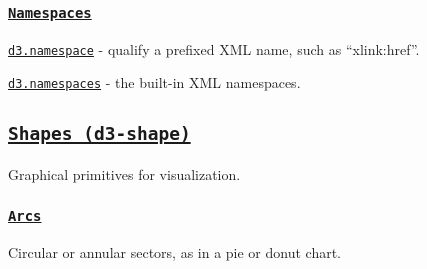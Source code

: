 \subsubsection*{\href{https://github.com/d3/d3-selection/blob/master/README.md#namespaces}{\tt Namespaces}}


\begin{DoxyItemize}
\item \href{https://github.com/d3/d3-selection/blob/master/README.md#namespace}{\tt d3.\+namespace} -\/ qualify a prefixed X\+ML name, such as “xlink\+:href”.
\item \href{https://github.com/d3/d3-selection/blob/master/README.md#namespaces}{\tt d3.\+namespaces} -\/ the built-\/in X\+ML namespaces.
\end{DoxyItemize}

\subsection*{\href{https://github.com/d3/d3-shape}{\tt Shapes (d3-\/shape)}}

Graphical primitives for visualization.

\subsubsection*{\href{https://github.com/d3/d3-shape/blob/master/README.md#arcs}{\tt Arcs}}

Circular or annular sectors, as in a pie or donut chart.


